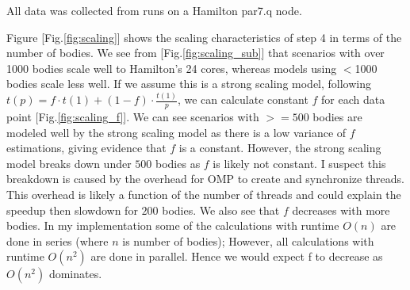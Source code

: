 \documentclass{article}
\begin{document}
All data was collected from runs on a Hamilton par7.q node.

Figure [Fig.\ref{fig:scaling}] shows the scaling characteristics of step 4 in terms of the number of bodies. 
We see from [Fig.\ref{fig:scaling_sub}] that scenarios with over 1000 bodies scale well to Hamilton's 24 cores, whereas models using $<$1000 bodies scale less well. 
If we assume this is a strong scaling model, following $t(p) = f \cdot t(1) + (1-f)\cdot \frac{t(1)}{p}$, we can calculate constant $f$ for each data point [Fig.\ref{fig:scaling_f}]. We can see scenarios with $>=500$ bodies are modeled well by the strong scaling model as there is a low variance of $f$ estimations, giving evidence that $f$ is a constant. 
However, the strong scaling model breaks down under $500$ bodies as $f$ is likely not constant. 
I suspect this breakdown is caused by the overhead for OMP to create and synchronize threads. 
This overhead is likely a function of the number of threads and could explain the speedup then slowdown for $200$ bodies.
We also see that $f$ decreases with more bodies. In my implementation some of the calculations with runtime $O(n)$ are done in series (where $n$ is number of bodies); However, all calculations with runtime $O(n^2)$ are done in parallel. Hence we would expect f to decrease as $O(n^2)$ dominates.
\end{document}
